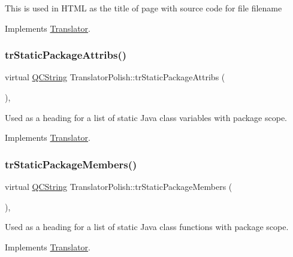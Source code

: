 This is used in H\+T\+ML as the title of page with source code for file filename 

Implements \mbox{\hyperlink{class_translator}{Translator}}.

\mbox{\label{class_translator_polish_a3240b7a231cbdf919ad2db0dac493482}} 
\subsubsection{\texorpdfstring{trStaticPackageAttribs()}{trStaticPackageAttribs()}}
{\footnotesize\ttfamily virtual \mbox{\hyperlink{class_q_c_string}{Q\+C\+String}} Translator\+Polish\+::tr\+Static\+Package\+Attribs (\begin{DoxyParamCaption}{ }\end{DoxyParamCaption})\hspace{0.3cm}{\ttfamily [inline]}, {\ttfamily [virtual]}}

Used as a heading for a list of static Java class variables with package scope. 

Implements \mbox{\hyperlink{class_translator}{Translator}}.

\mbox{\label{class_translator_polish_a238343357e9b2101031e62625898b551}} 
\subsubsection{\texorpdfstring{trStaticPackageMembers()}{trStaticPackageMembers()}}
{\footnotesize\ttfamily virtual \mbox{\hyperlink{class_q_c_string}{Q\+C\+String}} Translator\+Polish\+::tr\+Static\+Package\+Members (\begin{DoxyParamCaption}{ }\end{DoxyParamCaption})\hspace{0.3cm}{\ttfamily [inline]}, {\ttfamily [virtual]}}

Used as a heading for a list of static Java class functions with package scope. 

Implements \mbox{\hyperlink{class_translator}{Translator}}.

